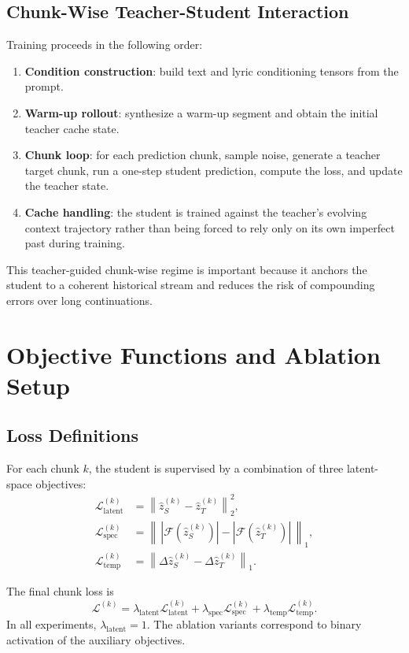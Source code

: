 \documentclass[11pt]{article}
\begin{document}
\subsection{Chunk-Wise Teacher-Student Interaction}

Training proceeds in the following order:
\begin{enumerate}
    \item \textbf{Condition construction}: build text and lyric conditioning tensors from the prompt.
    \item \textbf{Warm-up rollout}: synthesize a warm-up segment and obtain the initial teacher cache state.
    \item \textbf{Chunk loop}: for each prediction chunk, sample noise, generate a teacher target chunk, run a one-step student prediction, compute the loss, and update the teacher state.
    \item \textbf{Cache handling}: the student is trained against the teacher's evolving context trajectory rather than being forced to rely only on its own imperfect past during training.
\end{enumerate}

This teacher-guided chunk-wise regime is important because it anchors the student to a coherent historical stream and reduces the risk of compounding errors over long continuations.

\section{Objective Functions and Ablation Setup}

\subsection{Loss Definitions}

For each chunk \(k\), the student is supervised by a combination of three latent-space objectives:
\begin{align}
\mathcal{L}_{\mathrm{latent}}^{(k)} &= \left\|\hat{z}_S^{(k)} - \hat{z}_T^{(k)}\right\|_2^2, \\
\mathcal{L}_{\mathrm{spec}}^{(k)} &= \left\|\, |\mathcal{F}(\hat{z}_S^{(k)})| - |\mathcal{F}(\hat{z}_T^{(k)})| \,\right\|_1, \\
\mathcal{L}_{\mathrm{temp}}^{(k)} &= \left\| \Delta \hat{z}_S^{(k)} - \Delta \hat{z}_T^{(k)} \right\|_1.
\end{align}

The final chunk loss is
\[
\mathcal{L}^{(k)} =
\lambda_{\mathrm{latent}} \mathcal{L}_{\mathrm{latent}}^{(k)} +
\lambda_{\mathrm{spec}} \mathcal{L}_{\mathrm{spec}}^{(k)} +
\lambda_{\mathrm{temp}} \mathcal{L}_{\mathrm{temp}}^{(k)}.
\]
In all experiments, \(\lambda_{\mathrm{latent}} = 1\). The ablation variants correspond to binary activation of the auxiliary objectives.
\end{document}
